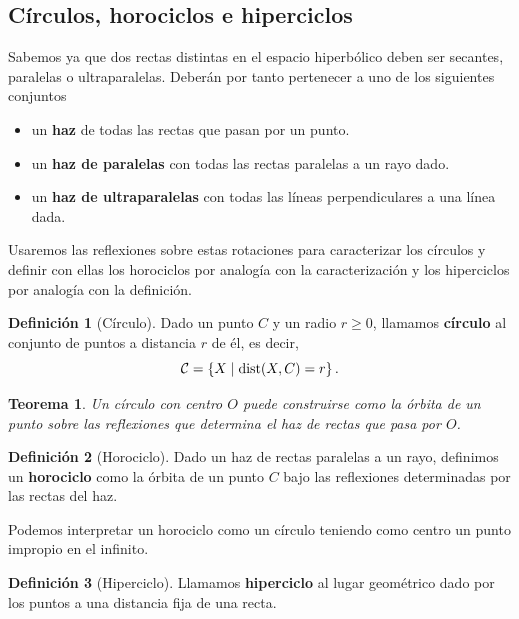 \documentclass{article}
\theoremstyle{plain}
\newtheorem{theorem}{Teorema}
\theoremstyle{definition}
\newtheorem{definition}{Definición}
\theoremstyle{remark}
\begin{document}
\subsection{Círculos, horociclos e hiperciclos}
Sabemos ya que dos rectas distintas en el espacio hiperbólico
deben ser secantes, paralelas o ultraparalelas. Deberán por tanto
pertenecer a uno de los siguientes conjuntos

\begin{itemize}
\item un \textbf{haz} de todas las rectas que pasan por un punto.
\item un \textbf{haz de paralelas} con todas las rectas paralelas a un
  rayo dado.
\item un \textbf{haz de ultraparalelas} con todas las líneas
  perpendiculares a una línea dada.
\end{itemize}

Usaremos las reflexiones sobre estas rotaciones para caracterizar los
círculos y definir con ellas los horociclos por analogía con la
caracterización y los hiperciclos por analogía con la definición.

\begin{definition}[Círculo]
  Dado un punto $C$ y un radio $r \geq 0$, llamamos \textbf{círculo}
  al conjunto de puntos a distancia $r$ de él, es decir,
  \[{\cal C} = \left\{ X \mid \mathrm{dist}(X,C) = r \right\}.\]
\end{definition}

\begin{theorem}
  Un círculo con centro $O$ puede construirse como la órbita de un punto
  sobre las reflexiones que determina el haz de rectas que pasa por $O$.
\end{theorem}

\begin{definition}[Horociclo]
  Dado un haz de rectas paralelas a un rayo, definimos un \textbf{horociclo} como
  la órbita de un punto $C$ bajo las reflexiones determinadas por las rectas del
  haz. \cite{coxeter}
\end{definition}

Podemos interpretar un horociclo como un círculo teniendo como centro un
punto impropio en el infinito.

\begin{definition}[Hiperciclo]
  Llamamos \textbf{hiperciclo} al lugar geométrico dado por los puntos a
  una distancia fija de una recta.
\end{definition}
\end{document}
